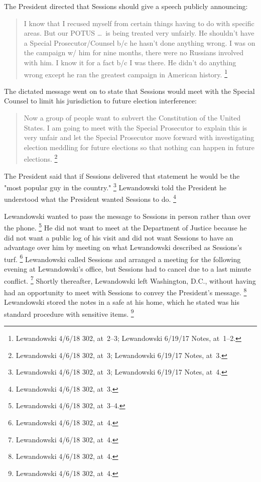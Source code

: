 {The President directed that Sessions should give a speech publicly announcing:

\begin{quote}
I know that I recused myself from certain things having to do with specific areas.
But our POTUS \dots\ is being treated very unfairly.
He shouldn't have a Special Prosecutor/Counsel b/c he hasn't done anything wrong.
I was on the campaign w/ him for nine months, there were no Russians involved with him.
I know it for a fact b/c I was there.
He didn't do anything wrong except he ran the greatest campaign in American history.%
\footnote{Lewandowski 4/6/18 302, at~2--3;
Lewandowski 6/19/17 Notes, at~1--2.}
\end{quote}

The dictated message went on to state that Sessions would meet with the Special Counsel to limit his jurisdiction to future election interference:

\begin{quote}
Now a group of people want to subvert the Constitution of the United States.
I am going to meet with the Special Prosecutor to explain this is very unfair and let the Special Prosecutor move forward with investigating election meddling for future elections so that nothing can happen in future elections.%
\footnote{Lewandowski 4/6/18 302, at~3;
Lewandowski 6/19/17 Notes, at~3.}
\end{quote}

The President said that if Sessions delivered that statement he would be the "most popular guy in the country."%
\footnote{Lewandowski 4/6/18 302, at~3;
Lewandowski 6/19/17 Notes, at~4.}
Lewandowski told the President he understood what the President wanted Sessions to do.%
\footnote{Lewandowski 4/6/18 302, at~3.}

Lewandowski wanted to pass the message to Sessions in person rather than over the phone.%
\footnote{Lewandowski 4/6/18 302, at~3--4.}
He did not want to meet at the Department of Justice because he did not want a public log of his visit and did not want Sessions to have an advantage over him by meeting on what Lewandowski described as Sessions's turf.%
\footnote{Lewandowski 4/6/18 302, at~4.}
Lewandowski called Sessions and arranged a meeting for the following evening at Lewandowski's office, but Sessions had to cancel due to a last minute conflict.%
\footnote{Lewandowski 4/6/18 302, at~4.}
Shortly thereafter, Lewandowski left Washington, D.C., without having had an opportunity to meet with Sessions to convey the President's message.%
\footnote{Lewandowski 4/6/18 302, at~4.}
Lewandowski stored the notes in a safe at his home, which he stated was his standard procedure with sensitive items.%
\footnote{Lewandowski 4/6/18 302, at~4.}

}
